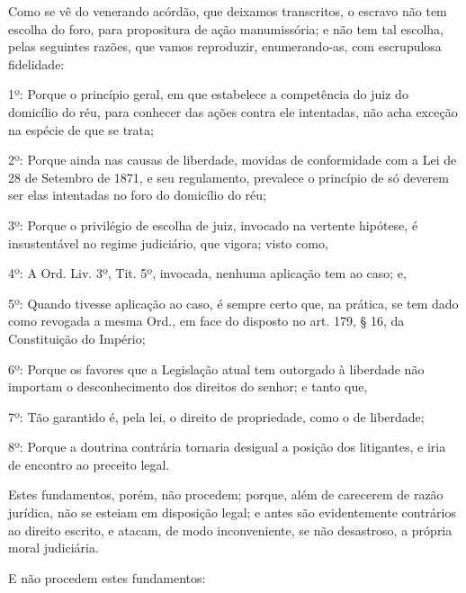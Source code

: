 Como se vê do venerando acórdão, que deixamos transcritos, o escravo não
tem escolha do foro, para propositura de ação manumissória; e não tem
tal escolha, pelas seguintes razões, que vamos reproduzir,
enumerando-as, com escrupulosa fidelidade:

1º: Porque o princípio geral, em que estabelece a competência do juiz do
domicílio do réu, para conhecer das ações contra ele intentadas, não
acha exceção na espécie de que se trata;

2º: Porque ainda nas causas de liberdade, movidas de conformidade com a
Lei de 28 de Setembro de 1871, e seu regulamento, prevalece o princípio
de só deverem ser elas intentadas no foro do domicílio do réu;

3º: Porque o privilégio de escolha de juiz, invocado na vertente
hipótese, é insustentável no regime judiciário, que vigora; visto como,

4º: A Ord. Liv. 3º, Tit. 5º, invocada, nenhuma aplicação tem ao caso; e,

5º: Quando tivesse aplicação ao caso, é sempre certo que, na prática, se
tem dado como revogada a mesma Ord., em face do disposto no art. 179, §
16, da Constituição do Império;

6º: Porque os favores que a Legislação atual tem outorgado à liberdade
não importam o desconhecimento dos direitos do senhor; e tanto que,

7º: Tão garantido é, pela lei, o direito de propriedade, como o de
liberdade;

8º: Porque a doutrina contrária tornaria desigual a posição dos
litigantes, e iria de encontro ao preceito legal.

Estes fundamentos, porém, não procedem; porque, além de carecerem de
razão jurídica, não se esteiam em disposição legal; e antes são
evidentemente contrários ao direito escrito, e atacam, de modo
inconveniente, se não desastroso, a própria moral judiciária.

E não procedem estes fundamentos:


